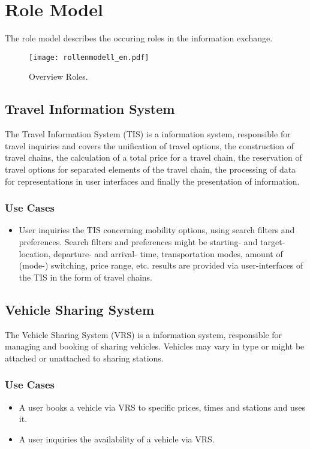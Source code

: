 \chapter{Role Model}
\label{cha:Rollenmodell}

The role model describes the occuring roles in the information exchange.

\begin{figure*}[ht]
\centering
\texttt{[image: rollenmodell\_en.pdf]}
\caption{Overview Roles.\label{fig:Rollenmodell}}
\end{figure*}

\section*{Travel Information System}
\label{sec:Rollenmodell:RIS}
The Travel Information System (TIS) is a information system, responsible for travel inquiries and covers the unification of travel options, the construction of travel chains, the calculation of a total price for a travel chain, the reservation of travel options for separated elements of the travel chain, the processing of data for representations in user interfaces and finally the presentation of information.

\subsection*{Use Cases}
\begin{itemize}
\item User inquiries the TIS concerning mobility options, using search filters and preferences. Search filters and preferences might be starting- and target- location, departure- and arrival- time, transportation modes, amount of (mode-) switching, price range, etc. results are provided via user-interfaces of the TIS in the form of travel chains. 
\end{itemize}

\section*{Vehicle Sharing System}
\label{sec:Rollenmodell:FVS}
The Vehicle Sharing System (VRS) is a information system, responsible for managing and booking of sharing vehicles. Vehicles may vary in type or might be attached or unattached to sharing stations.

\subsection*{Use Cases}
\begin{itemize}
\item A user books a vehicle via VRS to specific prices, times and stations and uses it.
\item A user inquiries the availability of a vehicle via VRS. 
\end{itemize}

